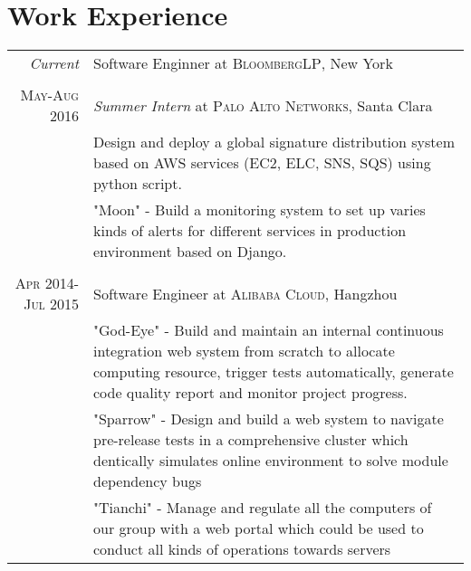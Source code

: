 \documentclass[a4paper,10pt]{article}
\begin{document}
\section{Work Experience}
\begin{tabular}{r|p{11cm}}
  \emph{Current} & Software Enginner at \textsc{BloombergLP}, New York\\
  \multicolumn{2}{c}{} \\
  \textsc{May-Aug 2016}&\emph{Summer Intern} at \textsc{Palo Alto Networks}, Santa Clara\\
  &\footnotesize{Design and deploy a global signature distribution system based on AWS services (EC2, ELC, SNS, SQS) using python script.}\\
  &\footnotesize{"Moon" - Build a monitoring system to set up varies kinds of alerts for different services in production environment based on Django.}\\
  \multicolumn{2}{c}{}\\
  \textsc{Apr 2014-Jul 2015} & Software Engineer at \textsc{Alibaba Cloud}, Hangzhou \\
  &\footnotesize{"God-Eye" - Build and maintain an internal continuous integration web system from scratch to allocate computing resource, trigger tests automatically, generate code quality report and monitor project progress.}\\
  &\footnotesize{"Sparrow" - Design and build a web system to navigate pre-release tests in a comprehensive cluster which dentically simulates online environment to solve module dependency bugs}\\
  &\footnotesize{"Tianchi" - Manage and regulate all the computers of our group with a web portal which could be used to conduct all kinds of operations towards servers
}\\
\end{tabular}

\end{document}
